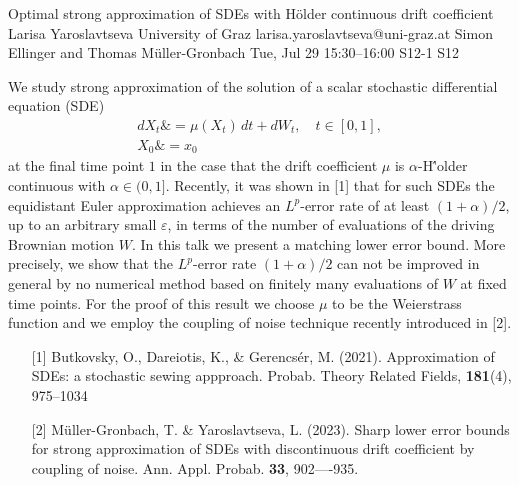 \begin{talk}
  {Optimal strong approximation of SDEs with H\"older continuous drift coefficient}%
  {Larisa Yaroslavtseva}%
  {University of Graz}%
  {larisa.yaroslavtseva@uni-graz.at}%
  {Simon Ellinger and Thomas Müller-Gronbach}%
  {}%
  {Tue, Jul 29 15:30–16:00}%
  {S12-1}%
  {S12}%
  
				
			
We study strong approximation of the solution of a scalar stochastic differential equation (SDE)
\begin{equation}\label{sde0}
	\begin{aligned}
		dX_t \& = \mu(X_t) \, dt +  dW_t, \quad t\in [0,1],\\
		X_0 \& = x_0
	\end{aligned}
\end{equation}
at the final time point $1$
in the case that  the drift coefficient  $\mu$ is $\alpha$-H\''older continuous with $\alpha\in(0, 1]$.
Recently, it was  shown in [1] that for such SDEs the equidistant Euler approximation achieves an $L^p$-error rate of at least $(1+\alpha)/2$, up to an arbitrary small $\varepsilon$,
in terms of the number of evaluations of the driving Brownian motion $W$.
In this talk  we  
present a matching  lower error bound.   More precisely, we show that
the $L^p$-error rate $(1+\alpha)/2$ can
not be improved in general by  no numerical 
method based on finitely many evaluations of $W$ at fixed time points. For the proof of this result we choose  $\mu$ to be the Weierstrass function and we employ  the coupling of noise technique  recently introduced in [2].




\begin{enumerate}
	\item[{[1]}] Butkovsky, O., Dareiotis, K., \& Gerencs\'er, M. (2021). Approximation of SDEs: a stochastic sewing appproach. Probab. Theory Related Fields, \textbf{181}(4), 975--1034
	\item[{[2]}] Müller-Gronbach, T.  \& Yaroslavtseva, L. (2023). Sharp lower error bounds for strong approximation of
	SDEs with discontinuous drift coefficient by coupling of noise. Ann. Appl. Probab. \textbf{33}, 902----935.
\end{enumerate}


\end{talk}

